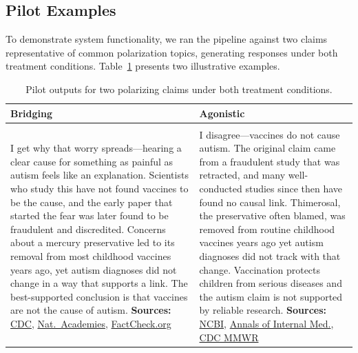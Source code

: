\documentclass{article}
\begin{document}
\subsection{Pilot Examples}\label{sec:pilot_examples}

To demonstrate system functionality, we ran the pipeline against two claims representative of common polarization topics, generating responses under both treatment conditions. Table~\ref{tab:pilot_examples} presents two illustrative examples.

\begin{table}[t]
\centering
\footnotesize
\caption{Pilot outputs for two polarizing claims under both treatment conditions.}
\label{tab:pilot_examples}
\begin{tabularx}{\columnwidth}{>{\raggedright\arraybackslash}X >{\raggedright\arraybackslash}X}
\toprule
\textbf{Bridging} & \textbf{Agonistic} \\
\midrule
\multicolumn{2}{c}{\textit{``Vaccines cause autism.''}} \\
\midrule
I get why that worry spreads---hearing a clear cause for something as painful as autism feels like an explanation. Scientists who study this have not found vaccines to be the cause, and the early paper that started the fear was later found to be fraudulent and discredited. Concerns about a mercury preservative led to its removal from most childhood vaccines years ago, yet autism diagnoses did not change in a way that supports a link. The best-supported conclusion is that vaccines are not the cause of autism. \newline\textbf{Sources:} \href{https://www.cdc.gov/vaccinesafety/concerns/autism.html}{CDC}, \href{https://www.nationalacademies.org/based-on-science/vaccines-do-not-cause-autism}{Nat.\ Academies}, \href{https://www.factcheck.org/2023/07/scicheck-false-claim-about-cause-of-autism-highlighted-on-pennsylvania-senate-panel/}{FactCheck.org}
& I disagree---vaccines do not cause autism. The original claim came from a fraudulent study that was retracted, and many well-conducted studies since then have found no causal link. Thimerosal, the preservative often blamed, was removed from routine childhood vaccines years ago yet autism diagnoses did not track with that change. Vaccination protects children from serious diseases and the autism claim is not supported by reliable research. \newline\textbf{Sources:} \href{https://ncbi.nlm.nih.gov/pmc/articles/PMC2831678/}{NCBI}, \href{https://acpjournals.org/doi/10.7326/M18-2101}{Annals of Internal Med.}, \href{https://cdc.gov/mmwr/volumes/65/ss/ss6503a1.htm}{CDC MMWR} \\

\end{tabularx}
\end{table}
\end{document}

